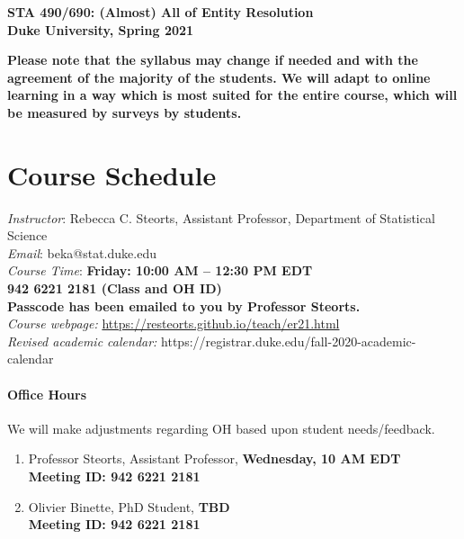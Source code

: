 \documentclass[11pt]{article}
\date{}
\begin{document}
\begin{center}
{\Large\bf STA 490/690: (Almost) All of Entity Resolution} \\

{\Large\bf Duke University, Spring 2021} \\
\end{center}

\textbf{Please note that the syllabus may change if needed and with the agreement of the majority of the students. We will adapt to online learning in a way which is most suited for the entire course, which will be measured by surveys by students.} \\

\section{Course Schedule}
\emph{Instructor}: Rebecca C. Steorts,  Assistant Professor,  Department of Statistical Science\\
\emph{Email}: beka@stat.duke.edu\\
\emph{Course Time}: \textbf{Friday: 10:00 AM -- 12:30 PM EDT} \\
\textbf{942 6221 2181 (Class and OH ID)}\\
\textbf{Passcode has been emailed to you by Professor Steorts.}\\

\emph{Course webpage:} \url{https://resteorts.github.io/teach/er21.html} \\
\emph{Revised academic calendar:} https://registrar.duke.edu/fall-2020-academic-calendar

\paragraph{Office Hours}
We will make adjustments regarding OH based upon student needs/feedback.
\begin{enumerate}
\item Professor Steorts, Assistant Professor, \textbf{Wednesday, 10 AM EDT} \\
\textbf{Meeting ID: 942 6221 2181}
\item Olivier Binette, PhD Student, \textbf{TBD}\\
\textbf{Meeting ID: 942 6221 2181}
\end{enumerate}


\end{document}
